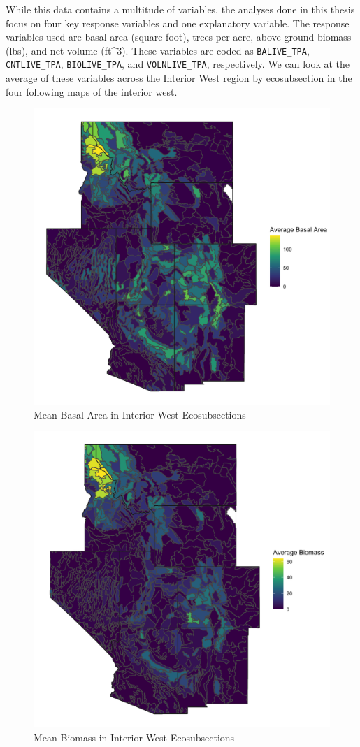 \documentclass[12pt,twoside]{reedthesis}
\begin{document}
While this data contains a multitude of variables, the analyses done in this thesis focus on four key response variables and one explanatory variable. The response variables used are basal area (square-foot), trees per acre, above-ground biomass (lbs), and net volume (ft\^{}3). These variables are coded as \texttt{BALIVE\_TPA}, \texttt{CNTLIVE\_TPA}, \texttt{BIOLIVE\_TPA}, and \texttt{VOLNLIVE\_TPA}, respectively. We can look at the average of these variables across the Interior West region by ecosubsection in the four following maps of the interior west.
\begin{figure}

{\centering \includegraphics[width=0.65\linewidth]{figure/basal} 

}

\caption{Mean Basal Area in Interior West Ecosubsections}\label{fig:unnamed-chunk-6}
\end{figure}
\begin{figure}

{\centering \includegraphics[width=0.65\linewidth]{figure/biomass} 

}

\caption{Mean Biomass in Interior West Ecosubsections}\label{fig:unnamed-chunk-7}
\end{figure}
\end{document}
